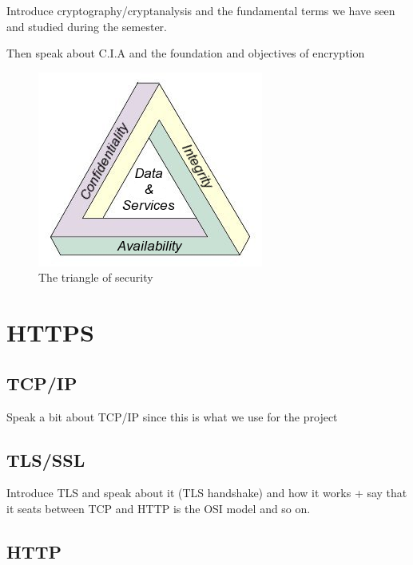 \documentclass[runningheads]{llncs}
\begin{document}
Introduce cryptography/cryptanalysis and the fundamental terms we have seen and studied during the semester.

Then speak about C.I.A and the foundation and objectives of encryption

\begin{figure}[h]
\centering
\includegraphics[width=\textwidth]{images/cia.png}
\caption{The triangle of security}
\label{fig:dbBuilder}
\end{figure}

\medskip

\section{HTTPS}

\subsection{TCP/IP}
Speak a bit about TCP/IP since this is what we use for the project

\subsection{TLS/SSL}

Introduce TLS and speak about it (TLS handshake) and how it works + say that it seats between TCP and HTTP is the OSI model and so on.

\subsection{HTTP}
\end{document}
